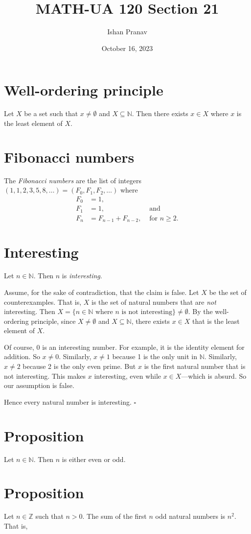 \documentclass[12pt]{article}
\title{MATH-UA 120 Section 21}
\author{Ishan Pranav}
\date{October 16, 2023}
\begin{document}
\maketitle
\section*{Well-ordering principle}
Let $X$ be a set such that $x\neq\emptyset$ and $X\subseteq\mathbb{N}$. Then there exists $x\in X$ where $x$ is the least element of $X$.
\section*{Fibonacci numbers}
The \textit{Fibonacci numbers} are the list of integers $(1,1,2,3,5,8,\dots)=(F_0,F_1,F_2,\dots)$ where
\begin{align*}
F_0&=1,\\
F_1&=1,&\text{ and}\\
F_n&=F_{n-1}+F_{n-2},&\text{ for }n\geq 2.
\end{align*}
\section*{Interesting}
Let $n\in\mathbb{N}$. Then $n$ is \textit{interesting}.

Assume, for the sake of contradiction, that the claim is false. Let $X$ be the set of counterexamples. That is, $X$ is the set of natural numbers that are \textit{not} interesting. Then $X=\{n\in\mathbb{N}\text{ where }n\text{ is not interesting}\}\neq\emptyset$. By the well-ordering principle, since $X\neq\emptyset$ and $X\subseteq\mathbb{N}$, there exists $x\in X$ that is the least element of $X$.

Of course, 0 is an interesting number. For example, it is the identity element for addition. So $x\neq 0$. Similarly, $x\neq 1$ because 1 is the only unit in $\mathbb{N}$. Similarly, $x\neq 2$ because 2 is the only even prime. But $x$ is the first natural number that is not interesting. This makes $x$ interesting, even while $x\in X$---which is absurd. So our assumption is false.

Hence every natural number is interesting. $\square$
\section*{Proposition}
Let $n\in\mathbb{N}$. Then $n$ is either even or odd.
\section*{Proposition}
Let $n\in\mathbb{Z}$ such that $n>0$. The sum of the first $n$ odd natural numbers is $n^2$. That is,
\end{document}
